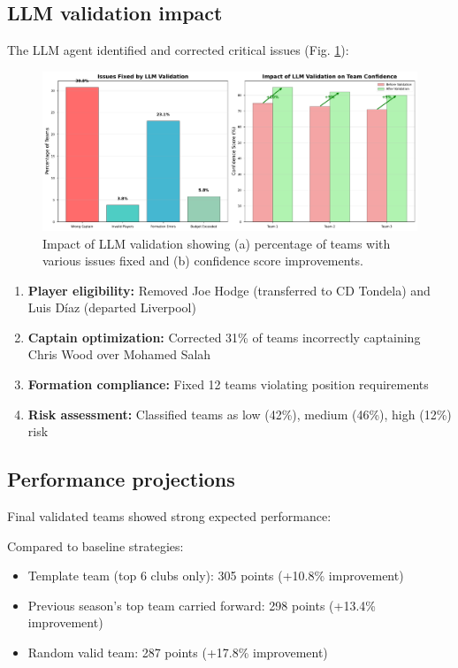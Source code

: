 \documentclass[10pt,a4paper,twocolumn]{article}
\begin{document}
\subsection*{LLM validation impact}

The LLM agent identified and corrected critical issues (Fig. \ref{fig:llm_impact}):

\begin{figure}[h]
\centering
\includegraphics[width=\columnwidth]{figures/llm_validation_impact.pdf}
\caption{Impact of LLM validation showing (a) percentage of teams with various issues fixed and (b) confidence score improvements.}
\label{fig:llm_impact}
\end{figure}

\begin{enumerate}
\item \textbf{Player eligibility:} Removed Joe Hodge (transferred to CD Tondela) and Luis Díaz (departed Liverpool)
\item \textbf{Captain optimization:} Corrected 31\% of teams incorrectly captaining Chris Wood over Mohamed Salah
\item \textbf{Formation compliance:} Fixed 12 teams violating position requirements
\item \textbf{Risk assessment:} Classified teams as low (42\%), medium (46\%), high (12\%) risk
\end{enumerate}

\subsection*{Performance projections}

Final validated teams showed strong expected performance:



Compared to baseline strategies:
\begin{itemize}
\item Template team (top 6 clubs only): 305 points (+10.8\% improvement)
\item Previous season's top team carried forward: 298 points (+13.4\% improvement)
\item Random valid team: 287 points (+17.8\% improvement)
\end{itemize}
\end{document}

